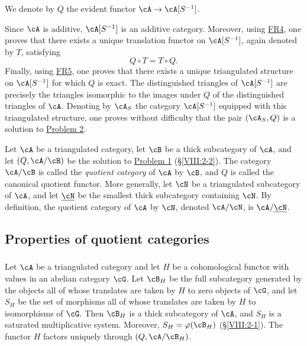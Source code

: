 We denote by $Q$ the evident functor $\cA\to \cA[S^{-1}]$.

Since $\cA$ is additive, $\cA[S^{-1}]$ is an additive category. Moreover,
using \hyperlink{VIII:FR4}{FR4}, one proves that there exists a unique
translation functor on $\cA[S^{-1}]$, again denoted by $T$, satisfying
\[
  Q\circ T = T\circ Q \text{.}
\]
Finally, using \hyperlink{VIII:FR5}{FR5}, one proves that there exists a
unique triangulated structure on $\cA[S^{-1}]$ for which $Q$ is exact.
The distinguished triangles of $\cA[S^{-1}]$ are precisely the triangles
isomorphic to the images under $Q$ of the distinguished triangles of
$\cA$. Denoting by $\cA_S$ the category $\cA[S^{-1}]$ equipped with this
triangulated structure, one proves without difficulty that the pair
$(\cA_S,Q)$ is a solution to \hyperlink{VIII:prob2}{Problem 2}.

\begin{definition}\label{VIII:2-3-3}
Let $\cA$ be a triangulated category, let $\cB$ be a thick subcategory of
$\cA$, and let $(Q,\cA/\cB)$ be the solution to
\hyperlink{VIII:prob1}{Problem 1} (\S \ref{VIII:2-2}). The category
$\cA/\cB$ is called the \emph{quotient category} of $\cA$ by $\cB$, and
$Q$ is called the canonical quotient functor. More generally, let $\cN$
be a triangulated subcategory of $\cA$, and let $\underline\cN$ be the
smallest thick subcategory containing $\cN$. By definition, the quotient
category of $\cA$ by $\cN$, denoted $\cA/\cN$, is
$\cA/\underline\cN$.
\end{definition}

\subsection{Properties of quotient categories}\label{VIII:2-4}

\subsubsection{}\label{VIII:2-4-1}

Let $\cA$ be a triangulated category and let $H$ be a cohomological functor
with values in an abelian category $\cG$. Let $\cB_H$ be the full
subcategory generated by the objects all of whose translates are taken by
$H$ to zero objects of $\cG$, and let $S_H$ be the set of morphisms all of
whose translates are taken by $H$ to isomorphisms of $\cG$. Then $\cB_H$
is a thick subcategory of $\cA$, and $S_H$ is a saturated multiplicative
system. Moreover, $S_H=\varphi(\cB_H)$ (\S \ref{VIII:2-1}). The functor
$H$ factors uniquely through $(Q,\cA/\cB_H)$.


